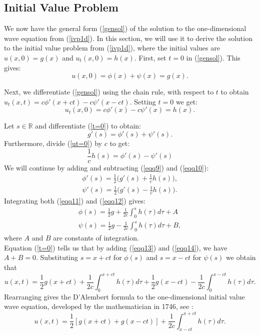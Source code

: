 \documentclass[a4paper, 12pt]{article}
\numberwithin{equation}{section}
\begin{document}
\subsection{Initial Value Problem}
We now have the general form (\ref{gensol}) of the solution to the
one-dimensional wave equation from (\ref{ivp1d}). In this section, we will use
it to derive the solution to the initial value problem from (\ref{ivp1d}),
where the initial values are $u(x,0)=g(x)$ and $u_t(x,0)=h(x)$. First, set $t=0$
in (\ref{gensol}). This gives:
\begin{equation} \label{t=0}
    u(x,0)=\phi(x)+\psi(x)=g(x).
\end{equation}

Next, we differentiate (\ref{gensol}) using the chain rule, with respect to $t$
to obtain $u_t(x,t)=c\phi'(x+ct)-c\psi'(x-ct)$. Setting $t=0$ we get:
\begin{equation} \label{ut=0}
    u_t(x,0)=c\phi'(x)-c\psi'(x)=h(x).
\end{equation}

Let $s \in \mathbb{R}$ and differentiate (\ref{t=0}) to obtain:
\begin{equation} \label{eqq9}
    g'(s)=\phi'(s)+\psi'(s).
\end{equation}
Furthermore, divide (\ref{ut=0}) by $c$ to get:
\begin{equation} \label{eqq10}
    \frac{1}{c}h(s)=\phi'(s)-\psi'(s)
\end{equation}
We will continue by adding and subtracting (\ref{eqq9}) and (\ref{eqq10}):
\begin{align} \label{eqq11}
    \phi'(s)=\frac{1}{2}\Big(g'(s)+\frac{1}{c}h(s)\Big),\\
    \label{eqq12}
    \psi'(s)=\frac{1}{2}\Big(g'(s)-\frac{1}{c}h(s)\Big).
\end{align}
Integrating both (\ref{eqq11}) and (\ref{eqq12}) gives:
\begin{align} \label{eqq13}
    \phi(s)=\frac{1}{2}g+\frac{1}{2c}\int^s_0h(\tau)d\tau+A\\
    \label{eqq14}
    \psi(s)=\frac{1}{2}g-\frac{1}{2c}\int^s_0h(\tau)d\tau+B,
\end{align}
where $A$ and $B$ are constants of integration. \\

Equation (\ref{t=0}) tells us that by adding (\ref{eqq13}) and (\ref{eqq14}), we
have $A+B=0$. Substituting $s=x+ct$ for $\phi(s)$ and $s=x-ct$ for $\psi(s)$ we
obtain that
\begin{equation*}
    u(x,t)=\frac{1}{2}g(x+ct)+\frac{1}{2c}\int^{x+ct}_0h(\tau)d\tau+\frac{1}{2}g(x-ct)-\frac{1}{2c}\int^{x-ct}_0h(\tau)d\tau.
\end{equation*}
Rearranging gives the D'Alembert formula to the one-dimensional initial value
wave equation, developed by the mathematician in 1746, see \cite[Ch. 2.1]{Str}:
\begin{equation} \label{DAla}
    u(x,t)=\frac{1}{2}\left[g(x+ct)+g(x-ct)\right]+\frac{1}{2c}\int^{x+ct}_{x-ct}h(\tau)d\tau.
\end{equation}
\end{document}
